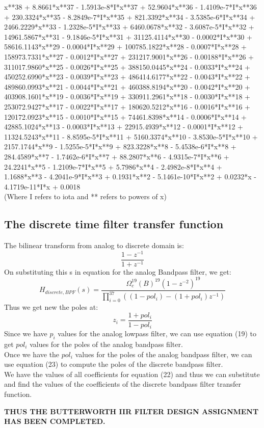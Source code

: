 \documentclass[12pt]{article}
\begin{document}
    x**38 + 8.8661*x**37 - 1.5913e-8*I*x**37 + 52.9604*x**36 - 1.4109e-7*I*x**36 + 230.3324*x**35 - 8.2849e-7*I*x**35 + 821.3392*x**34 - 3.5385e-6*I*x**34 + 2466.2229*x**33 - 1.2328e-5*I*x**33 + 6460.0678*x**32 - 3.6087e-5*I*x**32 + 14961.5867*x**31 - 9.1846e-5*I*x**31 + 31125.4114*x**30 - 0.0002*I*x**30 + 58616.1143*x**29 - 0.0004*I*x**29 + 100785.1822*x**28 - 0.0007*I*x**28 + 158973.7331*x**27 - 0.0012*I*x**27 + 231217.9001*x**26 - 0.00188*I*x**26 + 311017.9860*x**25 - 0.0026*I*x**25 + 388150.0445*x**24 - 0.0033*I*x**24 + 450252.6990*x**23 - 0.0039*I*x**23 + 486414.6177*x**22 - 0.0043*I*x**22 + 489860.0993*x**21 - 0.0044*I*x**21 + 460388.8194*x**20 - 0.0042*I*x**20 + 403908.1601*x**19 - 0.0036*I*x**19 + 330911.2961*x**18 - 0.0030*I*x**18 + 253072.9427*x**17 - 0.0022*I*x**17 + 180620.5212*x**16 - 0.0016*I*x**16 + 120172.0923*x**15 - 0.0010*I*x**15 + 74461.8398*x**14 - 0.0006*I*x**14 + 42885.1024*x**13 - 0.0003*I*x**13 + 22915.4939*x**12 - 0.0001*I*x**12 + 11324.5243*x**11 - 8.8595e-5*I*x**11 + 5160.3374*x**10 - 3.8530e-5*I*x**10 + 2157.1744*x**9 - 1.5255e-5*I*x**9 + 823.3228*x**8 - 5.4538e-6*I*x**8 + 284.4589*x**7 - 1.7462e-6*I*x**7 + 88.2807*x**6 - 4.9315e-7*I*x**6 + 24.2241*x**5 - 1.2109e-7*I*x**5 + 5.7986*x**4 - 2.4982e-8*I*x**4 + 1.1688*x**3 - 4.2041e-9*I*x**3 + 0.1931*x**2 - 5.1461e-10*I*x**2 + 0.0232*x - 4.1719e-11*I*x + 0.0018
    \\(Where I refers to iota and ** refers to powers of x)
\subsection{The discrete time filter transfer function}
The bilinear transform from analog to discrete domain is:
\begin{equation}
    \frac{1-z^{-1}}{1+z^{-1}}
\end{equation}
On substituting this s in equation for the analog Bandpass filter, we get:
\begin{equation}
    H_{discrete,BPF}(s)=\frac{\Omega_{c}^{19}(B)^{19}(1-z^{-2})^{19}}{\prod_{i=0}^{37}((1-pol_i)-(1+pol_i)z^{-1})} 
\end{equation}
Thus we get new the poles at:
\begin{equation}
    z_i=\frac{1+pol_i}{1-pol_i}
\end{equation}
Since we have $p_i$ values for the analog lowpass filter, we can use equation (19) to get $pol_i$ values for the poles of the analog bandpass filter. 
\\Once we have the  $pol_i$ values for the poles of the analog bandpass filter, we can use equation (23) to compute the poles of the discrete bandpass filter. 
\\We have the values of all coefficients for equation (22) and thus we can substitute and find the values of the coefficients of the discrete bandpass filter transfer function.
\vfill
\begin{center}
    

\textbf{THUS THE BUTTERWORTH IIR FILTER DESIGN ASSIGNMENT HAS BEEN COMPLETED.}
\end{center}
\newpage
\end{document}
